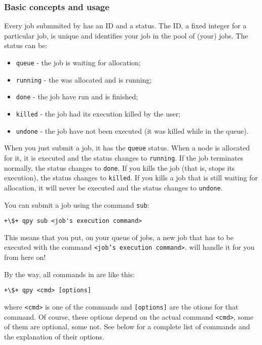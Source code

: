 \documentclass[a4paper,12pt]{article}
\begin{document}
\subsubsection{Basic concepts and usage}

Every job submmited by \qpy{} has an ID and a status.
The ID, a fixed integer for a particular job, is unique and identifies your job in the pool of (your) jobs.
The status can be:

\begin{itemize}
\item \texttt{queue}   - the job is waiting for allocation;
\item \texttt{running} - the was allocated and is running;
\item \texttt{done}    - the job have run and is finished;
\item \texttt{killed}  - the job had its execution killed by the user;
\item \texttt{undone}  - the job have not been executed (it was killed while in the queue).
\end{itemize}

When you just submit a job, it has the \texttt{queue} status.
When a node is allocated for it, it is executed and the status changes to \texttt{running}.
If the job terminates normally, the status changes to \texttt{done}.
If you kills the job (that is, stops its execution), the status changes to \texttt{killed}.
If you kills a job that is still waiting for allocation, it will never be executed and the status changes to \texttt{undone}.

You can submit a job using the command \texttt{sub}:
\begin{lstlisting}[style=BashStyle]
+\$+ qpy sub <job's execution command>
\end{lstlisting}
This means that you put, on your queue of jobs, a new job that has to be executed with the command \texttt{<job's execution command>}.
\qpy{} will handle it for you from here on!

By the way, all commands in \qpy{} are like this:
\begin{lstlisting}[style=BashStyle]
+\$+ qpy <cmd> [options]
\end{lstlisting}
where \texttt{<cmd>} is one of the \qpy{} commands and \texttt{[options]} are the otions for that command.
Of course, these options depend on the actual command \texttt{<cmd>}, some of them are optional, some not.
See below for a complete list of commands and the explanation of their options.
\end{document}
